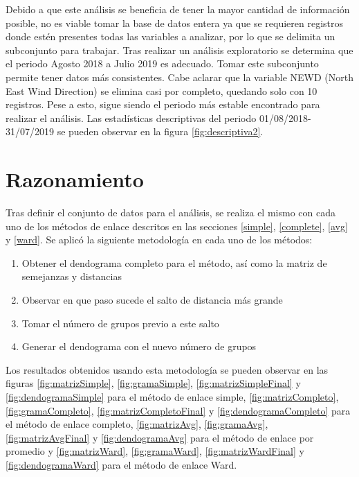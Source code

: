 \documentclass[journal, 10pt]{IEEEtran}                                                          %
\begin{document}
Debido a que este análisis se beneficia de tener la mayor cantidad de información posible, no es viable tomar la base de datos entera ya que se requieren registros donde estén presentes todas las variables a analizar, por lo que se delimita un subconjunto para trabajar. Tras realizar un análisis exploratorio se determina que el periodo Agosto 2018 a Julio 2019 es adecuado. Tomar este subconjunto permite tener datos más consistentes. Cabe aclarar que la variable NEWD (North East Wind Direction) se elimina casi por completo, quedando solo con 10 registros. Pese a esto, sigue siendo el periodo más estable encontrado para realizar el análisis. Las estadísticas descriptivas del periodo 01/08/2018-31/07/2019 se pueden observar en la figura \ref{fig:descriptiva2}. 

\section{Razonamiento} \label{razonamiento}

Tras definir el conjunto de datos para el análisis, se realiza el mismo con cada uno de los métodos de enlace descritos en las secciones \ref{simple}, \ref{complete}, \ref{avg} y \ref{ward}. Se aplicó la siguiente metodología en cada uno de los métodos: 

\begin{enumerate}
    \item Obtener el dendograma completo para el método, así como la matriz de semejanzas y distancias
    \item Observar en que paso sucede el salto de distancia más grande
    \item Tomar el número de grupos previo a este salto
    \item Generar el dendograma con el nuevo número de grupos
\end{enumerate}

Los resultados obtenidos usando esta metodología se pueden observar en las figuras \ref{fig:matrizSimple}, \ref{fig:gramaSimple}, \ref{fig:matrizSimpleFinal} y  \ref{fig:dendogramaSimple} para el método de enlace simple, \ref{fig:matrizCompleto}, \ref{fig:gramaCompleto}, \ref{fig:matrizCompletoFinal} y  \ref{fig:dendogramaCompleto} para el método de enlace completo, \ref{fig:matrizAvg}, \ref{fig:gramaAvg}, \ref{fig:matrizAvgFinal} y  \ref{fig:dendogramaAvg} para el método de enlace por promedio y \ref{fig:matrizWard}, \ref{fig:gramaWard}, \ref{fig:matrizWardFinal} y  \ref{fig:dendogramaWard} para el método de enlace Ward. 
\end{document}
